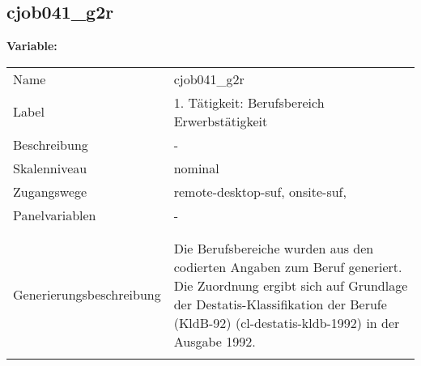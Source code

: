 	
	
	\subsection{cjob041\_g2r}
	\label{subSection:cjob041_g2r}

	\noindent\textbf{Variable:}\\
		\begin{tabular}{lL{11.3cm}}
			\label{tableVariable:cjob041_g2r}
			Name & cjob041\_g2r \\
			Label & 1. Tätigkeit: Berufsbereich Erwerbstätigkeit \\
			Beschreibung & - \\
			Skalenniveau & nominal \\
			Zugangswege &
				remote-desktop-suf,
				onsite-suf,
 \\
			Panelvariablen & -
			 \\
			 \\
 \\
					Generierungsbeschreibung & Die Berufsbereiche wurden aus den codierten Angaben zum Beruf generiert. Die Zuordnung ergibt sich auf Grundlage der Destatis-Klassifikation der Berufe (KldB-92) (cl-destatis-kldb-1992) in der Ausgabe 1992. 
				 \\	
			 \\
		\end{tabular}






